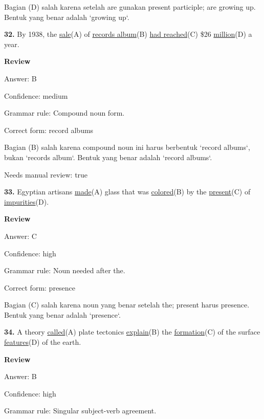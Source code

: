 \documentclass[12pt]{article}
\begin{document}
Bagian (D) salah karena setelah are gunakan present participle; are growing up. Bentuk yang benar adalah `growing up`.\par
\endgroup
\par
\vspace{\questionblockgap}
\noindent\textbf{32.} By 1938, the \uline{sale}(A) of \uline{records album}(B) \uline{had reached}(C) \$26 \uline{million}(D) a year.
\par
\begingroup
\setlength{\parskip}{0pt}
\setlength{\parindent}{0pt}
\textbf{Review}\par
Answer: B\par
Confidence: medium\par
Grammar rule: Compound noun form.\par
Correct form: record albums\par
Bagian (B) salah karena compound noun ini harus berbentuk `record albums`, bukan `records album`. Bentuk yang benar adalah `record albums`.\par
Needs manual review: true\par
\endgroup
\par
\vspace{\questionblockgap}
\noindent\textbf{33.} Egyptian artisans \uline{made}(A) glass that was \uline{colored}(B) by the \uline{present}(C) of \uline{impurities}(D).
\par
\begingroup
\setlength{\parskip}{0pt}
\setlength{\parindent}{0pt}
\textbf{Review}\par
Answer: C\par
Confidence: high\par
Grammar rule: Noun needed after the.\par
Correct form: presence\par
Bagian (C) salah karena noun yang benar setelah the; present harus presence. Bentuk yang benar adalah `presence`.\par
\endgroup
\par
\vspace{\questionblockgap}
\noindent\textbf{34.} A theory \uline{called}(A) plate tectonics \uline{explain}(B) the \uline{formation}(C) of the surface \uline{features}(D) of the earth.
\par
\begingroup
\setlength{\parskip}{0pt}
\setlength{\parindent}{0pt}
\textbf{Review}\par
Answer: B\par
Confidence: high\par
Grammar rule: Singular subject-verb agreement.\par
\end{document}

